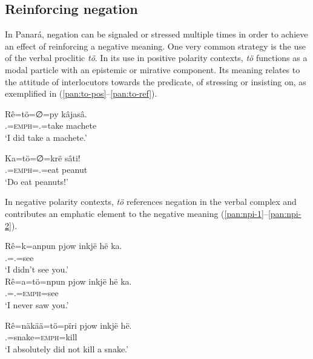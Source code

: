 \documentclass[output=paper,colorlinks,citecolor=brown,draft]{langscibook}
\begin{document}
\subsection{Reinforcing negation}\label{pan:sec:reinforcing}

In Panará, negation can be signaled or stressed multiple times in order to achieve an effect of reinforcing a negative meaning. One very common strategy is the use of the verbal proclitic \textit{tö}. In its use in positive polarity contexts, \textit{tö} functions as a modal particle with an epistemic or mirative component. Its meaning relates to the attitude of interlocutors towards the predicate, of stressing or insisting on, as exemplified in (\ref{pan:to-pos}--\ref{pan:to-ref}).

\ea\label{pan:to-pos}
    \gll Rê=tö=∅=py kâjasâ. \\
    \Fsg.\Erg{}=\textsc{emph}=\Tsg.\Abs{}=take machete  \\
    \glt `I did take a machete.' \\
\z

\ea\label{pan:to-ref}
    \gll Ka=tö=∅=krë sâti! \\
    \Ssg.\Erg{}=\textsc{emph}=\Tsg.\Abs{}=eat peanut  \\
    \glt `Do eat peanuts!' \\
\z


In negative polarity contexts, \textit{tö} references negation in the verbal complex and contributes an emphatic element to the negative meaning (\ref{pan:npi-1}--\ref{pan:npi-2}).

\ea\label{pan:npi-1}
    \ea
        \gll Rê=k=anpun pjow inkjë hë ka. \\
        \Fsg.\Erg{}=\Ssg.\Abs{}=see \Neg{} \Fsg{} \Erg{} \Ssg{}   \\
        \glt `I didn't see you.' \\
    \ex
        \gll Rê=a=tö=npun pjow inkjë hë ka. \\
        \Fsg.\Erg{}=\Ssg.\Abs{}=\textsc{emph}=see \Neg{} \Fsg{} \Erg{} \Ssg{}   \\
        \glt `I never saw you.' \\
    \z
\z

\ea\label{pan:npi-2}
    \gll Rê=näkää=tö=pïri pjow inkjë hë. \\
    \Fsg.\Erg{}=snake=\textsc{emph}=kill \Neg{} \Fsg{} \Erg{} \\
    \glt `I absolutely did not kill a snake.' \\
\z
\end{document}
